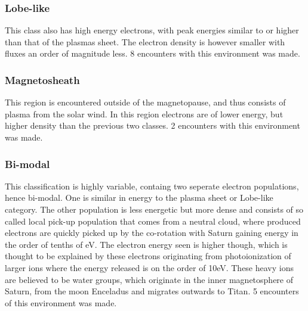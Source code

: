 \documentclass[12pt, parskip=full*, abstract]{scrartcl}
\begin{document}
\subsubsection{Lobe-like}
This class also has high energy electrons, with peak energies similar to or higher than that of the plasmas sheet. The electron density is however smaller with fluxes an order of magnitude less. 8 encounters with this environment was made.\parencite{Rymer-class}

\subsubsection{Magnetosheath}

This region is encountered outside of the magnetopause, and thus consists of plasma from the solar wind. In this region electrons are of lower energy, but higher density than the previous two classes. 2 encounters with this environment was made.\parencite{Rymer-class}

\subsubsection{Bi-modal}
This classification is highly variable, containg two seperate electron populations, hence bi-modal. One is similar in energy to the plasma sheet or Lobe-like category. The other population is less energetic but more dense and consists of so called local pick-up population that comes from a neutral cloud, where produced electrons are quickly picked up by the co-rotation with Saturn gaining energy in the order of tenths of eV. The electron energy seen is higher though, which is thought to be explained by these electrons originating from photoionization of larger ions where the energy released is on the order of 10eV. These heavy ions are believed to be water groups, which originate in the inner magnetosphere of Saturn, from the moon Enceladus and migrates outwards to Titan. 5 encounters of this environment was made.\parencite{Rymer-class}
\end{document}
